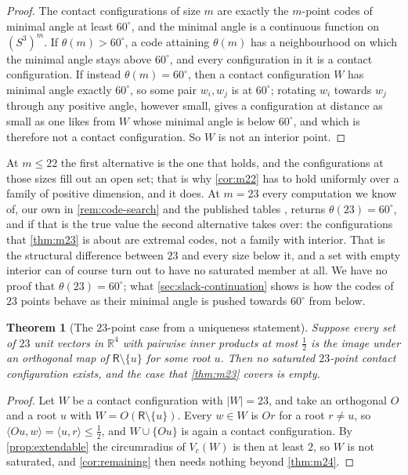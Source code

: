 \documentclass[11pt,reqno]{amsart}
\renewcommand{\_}{\origunderscore\allowbreak}
\numberwithin{equation}{section}
\theoremstyle{plain}
\newtheorem{thm}{Theorem}[section]
\theoremstyle{definition}
\theoremstyle{remark}
\newcommand{\Rt}{\mathsf{R}}                 %
\newcommand{\base}{u}                        %
\begin{document}
\begin{proof}
The contact configurations of size $m$ are exactly the $m$-point codes
of minimal angle at least $60^\circ$, and the minimal angle is a
continuous function on $(S^3)^m$. If $\theta(m)>60^\circ$, a code
attaining $\theta(m)$ has a neighbourhood on which the minimal angle
stays above $60^\circ$, and every configuration in it is a contact
configuration. If instead $\theta(m)=60^\circ$, then a contact
configuration $W$ has minimal angle exactly $60^\circ$, so some pair
$w_i,w_j$ is at $60^\circ$; rotating $w_i$ towards $w_j$ through any
positive angle, however small, gives a configuration at distance as
small as one likes from $W$ whose minimal angle is below $60^\circ$, and
which is therefore not a contact configuration. So $W$ is not an
interior point.
\end{proof}

At $m\le22$ the first alternative is the one that holds, and the
configurations at those sizes fill out an open set; that is why
\cref{cor:m22} has to hold uniformly over a family of positive
dimension, and it does. At $m=23$ every computation we know of, our own
in \cref{rem:code-search} and the published tables \cite{Slo}, returns
$\theta(23)=60^\circ$, and if that is the true value the second
alternative takes over: the configurations that \cref{thm:m23} is about
are extremal codes, not a family with interior. That is the structural
difference between $23$ and every size below it, and a set with empty
interior can of course turn out to have no saturated member at all. We
have no proof that $\theta(23)=60^\circ$; what \cref{sec:slack-continuation}
shows is how the codes of $23$ points behave as their minimal angle is
pushed towards $60^\circ$ from below.

\begin{thm}[The $23$-point case from a uniqueness statement]\label{thm:m23-from-codes}
Suppose every set of $23$ unit vectors in $\mathbb{R}^4$ with pairwise
inner products at most $\tfrac12$ is the image under an orthogonal map
of $\Rt\setminus\{\base\}$ for some root $\base$. Then no saturated
$23$-point contact configuration exists, and the case that
\cref{thm:m23} covers is empty.
\end{thm}

\begin{proof}
Let $W$ be a contact configuration with $|W|=23$, and take an orthogonal
$O$ and a root $\base$ with $W=O(\Rt\setminus\{\base\})$. Every $w\in W$
is $Or$ for a root $r\ne\base$, so
$\langle O\base,w\rangle=\langle\base,r\rangle\le\tfrac12$, and
$W\cup\{O\base\}$ is again a contact configuration. By
\cref{prop:extendable} the circumradius of $V_c(W)$ is then at least
$2$, so $W$ is not saturated, and \cref{cor:remaining} then needs
nothing beyond \cref{thm:m24}.
\end{proof}
\end{document}
